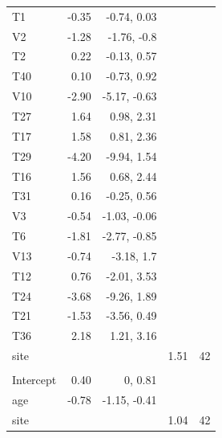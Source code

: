 \documentclass[
]{article}
\begin{document}
\begin{longtable}[t]{lrrrr}
\hspace{1em}T1 & -0.35 & -0.74, 0.03 &  & \\
\hspace{1em}V2 & -1.28 & -1.76, -0.8 &  & \\
\hspace{1em}T2 & 0.22 & -0.13, 0.57 &  & \\
\hspace{1em}T40 & 0.10 & -0.73, 0.92 &  & \\
\hspace{1em}V10 & -2.90 & -5.17, -0.63 &  & \\
\hspace{1em}T27 & 1.64 & 0.98, 2.31 &  & \\
\hspace{1em}T17 & 1.58 & 0.81, 2.36 &  & \\
\hspace{1em}T29 & -4.20 & -9.94, 1.54 &  & \\
\hspace{1em}T16 & 1.56 & 0.68, 2.44 &  & \\
\hspace{1em}T31 & 0.16 & -0.25, 0.56 &  & \\
\hspace{1em}V3 & -0.54 & -1.03, -0.06 &  & \\
\hspace{1em}T6 & -1.81 & -2.77, -0.85 &  & \\
\hspace{1em}V13 & -0.74 & -3.18, 1.7 &  & \\
\hspace{1em}T12 & 0.76 & -2.01, 3.53 &  & \\
\hspace{1em}T24 & -3.68 & -9.26, 1.89 &  & \\
\hspace{1em}T21 & -1.53 & -3.56, 0.49 &  & \\
\hspace{1em}T36 & 2.18 & 1.21, 3.16 &  & \\
\hspace{1em}site &  &  & 1.51 & 42\\
\addlinespace[0.3em]
\multicolumn{5}{l}{\textbf{Zero-inflation model}}\\
\hspace{1em}Intercept & 0.40 & 0, 0.81 &  & \\
\hspace{1em}age & -0.78 & -1.15, -0.41 &  & \\
\hspace{1em}site &  &  & 1.04 & 42\\
\bottomrule
\end{longtable}
\end{document}
